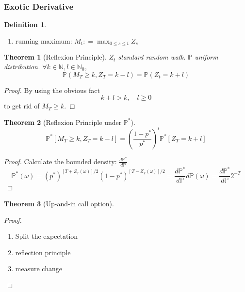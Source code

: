 \documentclass[a4paper,11pt]{book}
\newtheorem{theorem}{Theorem}[section]
\theoremstyle{definition}
\newtheorem{definition}{Definition}[section]
\theoremstyle{remark}
\begin{document}
\subsubsection*{Exotic Derivative}
\begin{definition} \quad
	\begin{enumerate}
		\item running maximum: $M_t : = \max_{0 \leq s \leq t} Z_s$
	\end{enumerate}
\end{definition}

\begin{theorem}[Reflexion Principle]
	$Z_t$ standard random walk. $\mathbb{P}$ uniform distribution.
	$\forall k \in \mathbb{N}, l \in \mathbb{N}_0$,
	\begin{equation*}
		\mathbb{P}(M_T \geq k, Z_T = k - l) = \mathbb{P}(Z_t = k + l)
	\end{equation*}
\end{theorem}
\begin{proof}
	By using the obvious fact
	\begin{equation*}
		k+l > k, \quad l \geq 0
	\end{equation*}
	to get rid of $M_T \geq k$. 
\end{proof}

\begin{theorem}[Reflexion Principle under $\mathbb{P}^*$]
\begin{equation*}
	\mathbb{P}^*[M_T \geq k, Z_T = k - l] = \left( \frac{1-p^*}{p^*} \right)^l \mathbb{P}^*[Z_T = k + l]
\end{equation*}
\end{theorem}
\begin{proof}
	Calculate the bounded density: $\frac{d\mathbb{P}^*}{d\mathbb{P}}$
	\begin{equation*}
		\mathbb{P}^*(\omega) = (p^*)^{[T + Z_T(\omega)]/2}(1-p^*)^{[T - Z_T(\omega)]/2} = \frac{d\mathbb{P}^*}{d\mathbb{P}} d\mathbb{P}(\omega) = \frac{d\mathbb{P}^*}{d\mathbb{P}} 2^{-T} 
	\end{equation*}
\end{proof}

\begin{theorem}[Up-and-in call option]
\end{theorem}
\begin{proof} \quad
	\begin{enumerate}
		\item Split the expectation
		\item reflection principle
		\item measure change
	\end{enumerate}
\end{proof}
\end{document}
